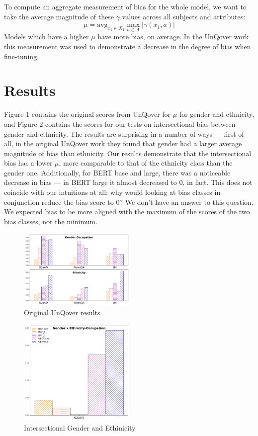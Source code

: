 \documentclass{article}
\newcommand{\avg}{\text{avg}}
\begin{document}
To compute an aggregate measurement of bias for the whole model, we want to take the average magnitude of these $\gamma$ values across all subjects and attributes:
\[
\mu = \avg_{x_1 \in X_1} \max_{a \in A} |\gamma(x_1, a)|
\]
Models which have a higher $\mu$ have more bias, on average. In the UnQover work this measurement was used to demonstrate a decrease in the degree of bias when fine-tuning. 

\section{Results}

Figure 1 contains the original scores from UnQover for $\mu$ for gender and ethnicity, and Figure 2 contains the scores for our tests on intersectional bias between gender and ethnicity. The results are surprising in a number of ways --- first of all, in the original UnQover work they found that gender had a larger average magnitude of bias than ethnicity. Our results demonstrate that the intersectional bias has a lower $\mu$, more comparable to that of the ethnicity class than the gender one. Additionally, for BERT base and large, there was a noticeable decrease in bias --- in BERT large it almost decreased to $0$, in fact. This does not coincide with our intuitions at all: why would looking at bias classes in conjunction reduce the bias score to $0$? We don't have an answer to this question. We expected bias to be more aligned with the maximum of the scores of the two bias classes, not the minimum.

\begin{figure}[h]
  \centering
  \includegraphics[width=0.5\textwidth]{theirs}
  \caption{Original UnQover results}
\end{figure}
\begin{figure}[h]
  \centering
  \includegraphics[width=0.5\textwidth]{ours}
  \caption{Intersectional Gender and Ethinicity}
\end{figure}
\end{document}
